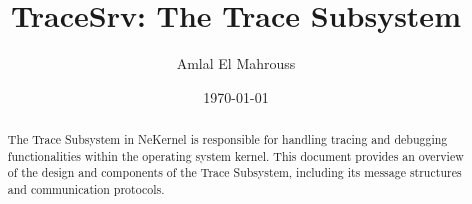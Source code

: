 \documentclass{article}
\title{TraceSrv: The Trace Subsystem}
\author{Amlal El Mahrouss}
\date{\today}
\begin{document}
\maketitle

\begin{abstract}
{The Trace Subsystem in NeKernel is responsible for handling tracing and debugging functionalities within the operating system kernel. 
This document provides an overview of the design and components of the Trace Subsystem, including its message structures and communication protocols.}
\end{abstract}
\end{document}
